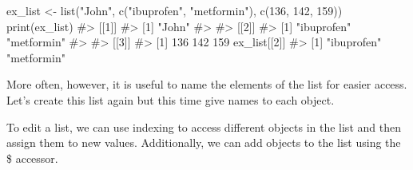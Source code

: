\documentclass[
  letterpaper,
]{krantz}
\makeatletter
\newenvironment{Shaded}{\begin{snugshade}}{\end{snugshade}}
\newcommand{\AttributeTok}[1]{\textcolor[rgb]{0.40,0.45,0.13}{#1}}
\newcommand{\CommentTok}[1]{\textcolor[rgb]{0.37,0.37,0.37}{#1}}
\newcommand{\DecValTok}[1]{\textcolor[rgb]{0.68,0.00,0.00}{#1}}
\newcommand{\FunctionTok}[1]{\textcolor[rgb]{0.28,0.35,0.67}{#1}}
\newcommand{\NormalTok}[1]{\textcolor[rgb]{0.00,0.23,0.31}{#1}}
\newcommand{\OtherTok}[1]{\textcolor[rgb]{0.00,0.23,0.31}{#1}}
\newcommand{\SpecialCharTok}[1]{\textcolor[rgb]{0.37,0.37,0.37}{#1}}
\newcommand{\StringTok}[1]{\textcolor[rgb]{0.13,0.47,0.30}{#1}}
\newenvironment{kframe}{%
\medskip{}
\setlength{\fboxsep}{.8em}
 \def\at@end@of@kframe{}%
 \ifinner\ifhmode%
  \def\at@end@of@kframe{\end{minipage}}%
  \begin{minipage}{\columnwidth}%
 \fi\fi%
 \def\FrameCommand##1{\hskip\@totalleftmargin \hskip-\fboxsep
 \colorbox{shadecolor}{##1}\hskip-\fboxsep
     \hskip-\linewidth \hskip-\@totalleftmargin \hskip\columnwidth}%
 \MakeFramed {\advance\hsize-\width
   \@totalleftmargin\z@ \linewidth\hsize
   \@setminipage}}%
 {\par\unskip\endMakeFramed%
 \at@end@of@kframe}
\renewenvironment{Shaded}{\begin{kframe}}{\end{kframe}}
\makeatother
\begin{document}
\begin{Shaded}
\begin{Highlighting}[]
\NormalTok{ex\_list }\OtherTok{\textless{}{-}} \FunctionTok{list}\NormalTok{(}\StringTok{"John"}\NormalTok{, }\FunctionTok{c}\NormalTok{(}\StringTok{"ibuprofen"}\NormalTok{, }\StringTok{"metformin"}\NormalTok{), }\FunctionTok{c}\NormalTok{(}\DecValTok{136}\NormalTok{, }\DecValTok{142}\NormalTok{, }\DecValTok{159}\NormalTok{))}
\FunctionTok{print}\NormalTok{(ex\_list)}
\CommentTok{\#\textgreater{} [[1]]}
\CommentTok{\#\textgreater{} [1] "John"}
\CommentTok{\#\textgreater{} }
\CommentTok{\#\textgreater{} [[2]]}
\CommentTok{\#\textgreater{} [1] "ibuprofen" "metformin"}
\CommentTok{\#\textgreater{} }
\CommentTok{\#\textgreater{} [[3]]}
\CommentTok{\#\textgreater{} [1] 136 142 159}
\NormalTok{ex\_list[[}\DecValTok{2}\NormalTok{]]}
\CommentTok{\#\textgreater{} [1] "ibuprofen" "metformin"}
\end{Highlighting}
\end{Shaded}

More often, however, it is useful to name the elements of the list for
easier access. Let's create this list again but this time give names to
each object.

\begin{Shaded}
\end{Shaded}

To edit a list, we can use indexing to access different objects in the
list and then assign them to new values. Additionally, we can add
objects to the list using the \$ accessor.
\end{document}
